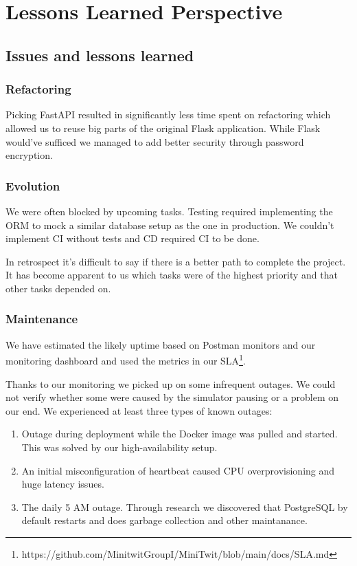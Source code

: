 \documentclass{article}
\begin{document}
\section{Lessons Learned Perspective}

\subsection{Issues and lessons learned}

\subsubsection{Refactoring} 

Picking FastAPI resulted in significantly less time spent on refactoring which allowed us to reuse big parts of the original Flask application. While Flask would've sufficed we managed to add better security through password encryption. 

\subsubsection{Evolution}

We were often blocked by upcoming tasks. Testing required implementing the ORM to mock a similar database setup as the one in production. We couldn't implement CI without tests and CD required CI to be done. 

In retrospect it's difficult to say if there is a better path to complete the project. It has become apparent to us which tasks were of the highest priority and that other tasks depended on. 

\subsubsection{Maintenance}

We have estimated the likely uptime based on Postman monitors and our monitoring dashboard and used the metrics in our SLA\footnote{https://github.com/MinitwitGroupI/MiniTwit/blob/main/docs/SLA.md}. 

Thanks to our monitoring we picked up on some infrequent outages. We could not verify whether some were caused by the simulator pausing or a problem on our end. We experienced at least three types of known outages:

\begin{enumerate}
    \item Outage during deployment while the Docker image was pulled and started. This was solved by our high-availability setup. 
    \item An initial misconfiguration of heartbeat caused CPU overprovisioning and huge latency issues.
    \item The daily 5 AM outage. Through research we discovered that PostgreSQL by default restarts and does garbage collection and other maintanance. 
\end{enumerate}
\end{document}
